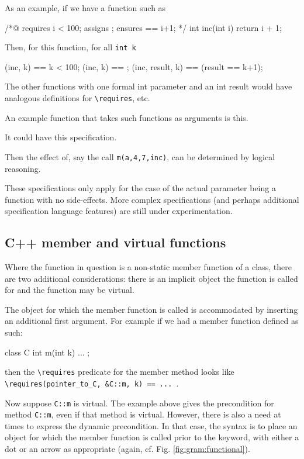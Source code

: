 As an example, if we have a function such as
\begin{listing-nonumber}
/*@ requires i < 100;
    assigns \empty;
    ensures \result == i+1;
*/
int inc(int i) { return i + 1; }
\end{listing-nonumber}
Then, for this function, for all \lstinline|int k|
\begin{listing-nonumber}
\requires(inc, k) == k < 100;
\assigns(inc, k) == \empty;
\ensures(inc, result, k) == (result == k+1);
\end{listing-nonumber}
The other functions with one formal int parameter and an int result would have analogous definitions for \lstinline|\requires|, etc.

An example function that takes such functions as arguments is this.



It could have this specification.



Then the effect of, say the call \lstinline|m(a,4,7,inc)|, can be determined by logical reasoning.

These specifications only apply for the case of the actual parameter being a function with no side-effects. More complex specifications (and perhaps additional specification language features) are still under experimentation.

\subsection{C++ member and virtual functions}

Where the function in question is a non-static member function of a class,
there are two
additional considerations: there is an implicit object the function
is called for and the function may be virtual.

The object for which the member function is called is accommodated by inserting
an additional first argument. For example if we had a member function defined
as such:
\begin{listing-nonumber}
class C {
  int m(int k) { ... }
};
\end{listing-nonumber}
then the  \lstinline|\requires| predicate for the member method looks like \lstinline|\requires(pointer_to_C, &C::m, k) == ... |.

Now suppose \lstinline|C::m| is virtual. The example above gives the
precondition for method \lstinline|C::m|, even if that method is
virtual. However, there is also a need at times to express the dynamic
precondition. In that case, the syntax is to place an object for which
the member function is called prior to
the keyword, with either a dot or an arrow as appropriate (again,
cf. Fig. \ref{fig:gram:functional}).


